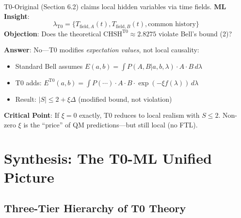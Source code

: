 	T0-Original (Section 6.2) claims local hidden variables via time fields. \textbf{ML Insight}:
	\begin{equation}
		\lambda_{\text{T0}} = \{T_{\text{field},A}(t), T_{\text{field},B}(t), \text{common history}\} \tag{ML-Eq.~7.1}
	\end{equation}
	\textbf{Objection}: Does the theoretical $\text{CHSH}^{\text{T0}}\approx2.8275$ violate Bell's bound (2)?
	
	\textbf{Answer}: No---T0 modifies \textit{expectation values}, not local causality:
	\begin{itemize}
		\item Standard Bell assumes $E(a,b) = \int P(A,B|a,b,\lambda) \cdot A \cdot B \, d\lambda$
		\item T0 adds: $E^{\text{T0}}(a,b) = \int P(\cdots) \cdot A \cdot B \cdot \exp(-\xi f(\lambda)) \, d\lambda$
		\item Result: $|S| \leq 2 + \xi\Delta$ (modified bound, not violation)
	\end{itemize}
	\textbf{Critical Point}: If $\xi=0$ exactly, T0 reduces to local realism with $S\leq2$. Non-zero $\xi$ is the ``price'' of QM predictions---but still local (no FTL).
	
	\section{Synthesis: The T0-ML Unified Picture}
	
	\subsection{Three-Tier Hierarchy of T0 Theory}
	
